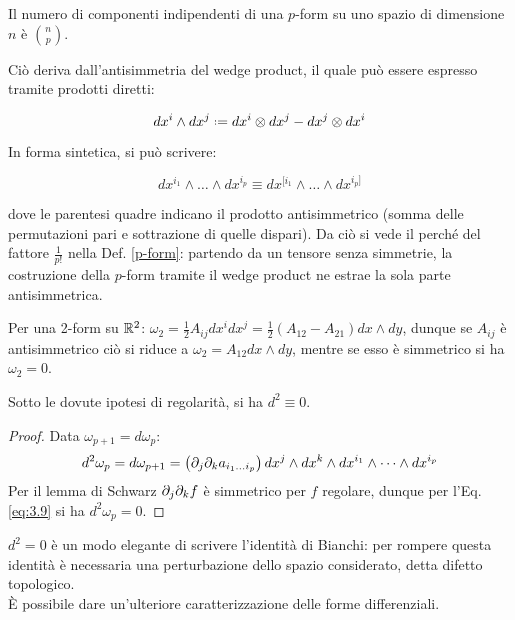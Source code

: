 \begin{proposition}
	Il numero di componenti indipendenti di una $ p $-form su uno spazio di dimensione $ n $ è $ \binom{n}{p} $.
\end{proposition}

Ciò deriva dall'antisimmetria del wedge product, il quale può essere espresso tramite prodotti diretti:

\begin{equation}
	dx^i \wedge dx^j \defeq dx^i \otimes dx^j - dx^j \otimes dx^i
	\label{eq:3.9}
\end{equation}

In forma sintetica, si può scrivere:

\begin{equation}
	dx^{i_1} \wedge \dots \wedge dx^{i_p} \equiv dx^{[i_1} \wedge \dots \wedge dx^{i_p]}
	\label{eq:3.10}
\end{equation}

dove le parentesi quadre indicano il prodotto antisimmetrico (somma delle permutazioni pari e sottrazione di quelle dispari). Da ciò si vede il perché del fattore $ \frac{1}{p!} $ nella Def. \ref{p-form}: partendo da un tensore senza simmetrie, la costruzione della $ p $-form tramite il wedge product ne estrae la sola parte antisimmetrica.

\begin{example}
	Per una 2-form su $ \mathbb{R}^2 $: $ \omega_2 = \frac{1}{2} A_{ij} dx^i dx^j = \frac{1}{2}\left( A_{12} - A_{21} \right) dx \wedge dy $, dunque se $ A_{ij} $ è antisimmetrico ciò si riduce a $ \omega_2 = A_{12} dx \wedge dy $, mentre se esso è simmetrico si ha $ \omega_2 = 0 $.
\end{example}

\begin{proposition}\label{id-bianchi}
	Sotto le dovute ipotesi di regolarità, si ha $ d^2 \equiv 0 $.
\end{proposition}
\begin{proof}
	Data $ \omega_{p+1} = d\omega_p $:
	\begin{equation*}
		d^2 \omega_p = d\omega_{p+1} = \left( \partial_j \partial_k a_{i_1 \dots i_p} \right) dx^j \wedge dx^k \wedge dx^{i_1} \wedge \dots \wedge dx^{i_p}
	\end{equation*}
	Per il lemma di Schwarz $ \partial_j \partial_k f $ è simmetrico per $ f $ regolare, dunque per l'Eq. \ref{eq:3.9} si ha $ d^2 \omega_p = 0 $.
\end{proof}

$ d^2 = 0 $ è un modo elegante di scrivere l'identità di Bianchi: per rompere questa identità è necessaria una perturbazione dello spazio considerato, detta difetto topologico.\\
È possibile dare un'ulteriore caratterizzazione delle forme differenziali.

